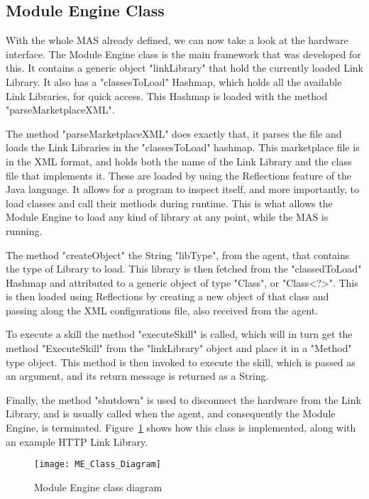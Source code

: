 \subsection{Module Engine Class}
\label{subsec:module_engine}

With the whole \acrshort{MAS} already defined, we can now take a look at the hardware interface. The Module Engine class is the main framework that was developed for this. It contains a generic object "linkLibrary" that hold the currently loaded Link Library. It also has a "classesToLoad" Hashmap, which holds all the available Link Libraries, for quick access. This Hashmap is loaded with the method "parseMarketplaceXML".

The method "parseMarketplaceXML" does exactly that, it parses the file and loads the Link Libraries in the "classesToLoad" hashmap. This marketplace file is in the \acrshort{XML} format, and holds both the name of the Link Library and the class file that implements it. These are loaded by using the Reflections feature of the Java language. It allows for a program to inspect itself, and more importantly, to load classes and call their methods during runtime. This is what allows the Module Engine to load any kind of library at any point, while the \acrshort{MAS} is running.

The method "createObject" the String "libType", from the agent, that contains the type of Library to load. This library is then fetched from the "classedToLoad" Hashmap and attributed to a generic object of type "Class", or "Class<?>". This is then loaded using Reflections by creating a new object of that class and passing along the \acrshort{XML} configurations file, also received from the agent.

To execute a skill the method "executeSkill" is called, which will in turn get the method "ExecuteSkill" from the "linkLibrary" object and place it in a "Method" type object. This method is then invoked to execute the skill, which is passed as an argument, and its return message is returned as a String.

Finally, the method "shutdown" is used to disconnect the hardware from the Link Library, and is usually called when the agent, and consequently the Module Engine, is terminated. Figure~\ref{fig:module_engine_class_diagram} shows how this class is implemented, along with an example \acrshort{HTTP} Link Library.\\

\begin{figure}[h!]
	\centering
	\texttt{[image: ME\_Class\_Diagram]}
	\caption{Module Engine class diagram}
	\label{fig:module_engine_class_diagram}
\end{figure}

